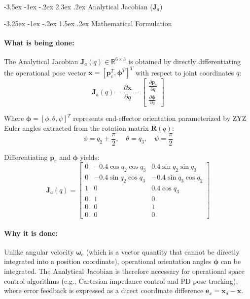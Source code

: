 \documentclass[11pt, a4paper]{article}
\makeatletter
\renewcommand{\section}{\@startsection{section}{1}{\z@}%
    {-3.5ex \@plus -1ex \@minus -.2ex}%
    {2.3ex \@plus .2ex}%
    {\normalfont\Large\bfseries\color{brandblue}}}
\renewcommand{\subsection}{\@startsection{subsection}{2}{\z@}%
    {-3.25ex \@plus -1ex \@minus -.2ex}%
    {1.5ex \@plus .2ex}%
    {\normalfont\large\bfseries\color{brandaccent}}}
\makeatother
\begin{document}
\section{\texorpdfstring{Analytical Jacobian ($\mathbf{J}_a$)}{Analytical Jacobian (Ja)}}

\subsection{Mathematical Formulation}
\paragraph{What is being done:}
The Analytical Jacobian $\mathbf{J}_a(q) \in \mathbb{R}^{6 \times 3}$ is obtained by directly differentiating the operational pose vector $\mathbf{x} = [\mathbf{p}_e^T, \boldsymbol{\phi}^T]^T$ with respect to joint coordinates $q$:
\begin{equation}
    \mathbf{J}_a(q) = \frac{\partial \mathbf{x}}{\partial q} = \begin{bmatrix} \frac{\partial \mathbf{p}_e}{\partial q} \\[0.4em] \frac{\partial \boldsymbol{\phi}}{\partial q} \end{bmatrix}
\end{equation}

Where $\boldsymbol{\phi} = [\phi, \theta, \psi]^T$ represents end-effector orientation parameterized by ZYZ Euler angles extracted from the rotation matrix $\mathbf{R}(q)$:
\begin{equation}
    \phi = q_2 + \frac{\pi}{2}, \quad \theta = q_3, \quad \psi = \frac{\pi}{2}
\end{equation}

Differentiating $\mathbf{p}_e$ and $\boldsymbol{\phi}$ yields:
\begin{equation}
\mathbf{J}_a(q) = \begin{bmatrix}
0 & -0.4 \cos q_2 \cos q_3 & 0.4 \sin q_2 \sin q_3 \\
0 & -0.4 \sin q_2 \cos q_3 & -0.4 \sin q_3 \cos q_2 \\
1 & 0 & 0.4 \cos q_3 \\
0 & 1 & 0 \\
0 & 0 & 1 \\
0 & 0 & 0
\end{bmatrix}
\end{equation}

\paragraph{Why it is done:}
Unlike angular velocity $\boldsymbol{\omega}_e$ (which is a vector quantity that cannot be directly integrated into a position coordinate), operational orientation angles $\boldsymbol{\phi}$ can be integrated. The Analytical Jacobian is therefore necessary for operational space control algorithms (e.g., Cartesian impedance control and PD pose tracking), where error feedback is expressed as a direct coordinate difference $\mathbf{e}_x = \mathbf{x}_d - \mathbf{x}$.
\end{document}
